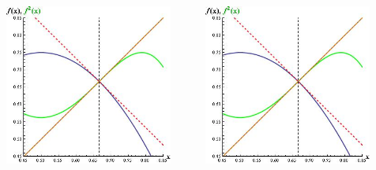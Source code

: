 \documentclass[a4,compress,handout]{beamer}
\begin{document}
\begin{frame}
\begin{columns}[c]
\begin{column}{0.3\textwidth}
		\end{column}
		\begin{column}{0.3\textwidth}
			\hfill\includegraphics[width=0.9\textwidth]{229a.jpg}\hspace*{\fill}
			
			
		\end{column}
		\begin{column}{0.4\textwidth}
			\hfill\includegraphics[width=0.9\textwidth]{229a.jpg}\hspace*{\fill}
			

\end{column}
\end{columns}
\end{frame}
\end{document}
